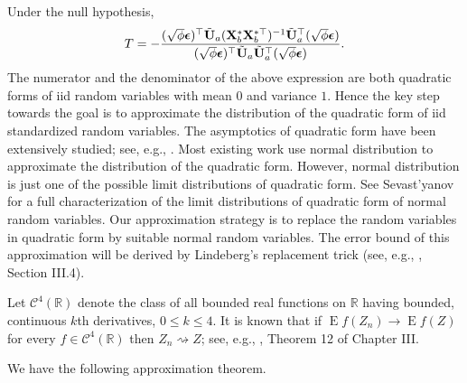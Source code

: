 \documentclass[bj]{imsart}
\DeclareMathOperator{\myE}{E}
\theoremstyle{plain}
\theoremstyle{definition}
\theoremstyle{remark}
\begin{document}
Under the null hypothesis,
\begin{equation*}
    T=-\frac{ (\sqrt \phi \bepsilon)^\top \tilde \BU_a (\BX_b^* \BX_b^{*\top})^{-1} \tilde \BU_a^\top (\sqrt \phi \bepsilon)}{ (\sqrt \phi \bepsilon)^\top \tilde \BU_a  \tilde \BU_a^\top (\sqrt \phi \bepsilon)}.
\end{equation*}
The numerator and the denominator of the above expression are both quadratic forms of iid random variables with mean $0$ and variance $1$.
Hence the key step towards the goal is to approximate the distribution of the quadratic form of iid standardized random variables.
The asymptotics of quadratic form have been extensively studied; see, e.g., \cite{jiang1996reml,Bentkus1996Optimal,Goetze2002,Dicker2015Flexible,Bai2017}.
Most existing work use normal distribution to approximate the distribution of the quadratic form.
However, normal distribution is just one of the possible limit distributions of quadratic form.
See Sevast'yanov \cite{Sevast1961A} for a full characterization of the limit distributions of quadratic form of normal random variables.
Our approximation strategy is to replace the random variables in quadratic form by suitable normal random variables.
The error bound of this approximation will be derived by Lindeberg's replacement trick (see, e.g., \cite{pollard1984convergence}, Section III.4).

Let $\mathscr C^4(\mathbb R)$ denote the class of all bounded real functions on $\mathbb R$ having bounded, continuous $k$th derivatives, $0\leq k\leq 4$.
It is known that if $\myE f(Z_n)\to \myE f(Z)$ for every $f\in \mathscr C^4 (\mathbb R)$ then $Z_n \rightsquigarrow Z$; see, e.g., \cite{pollard1984convergence}, Theorem 12 of Chapter III.




We have the following approximation theorem.
\end{document}
